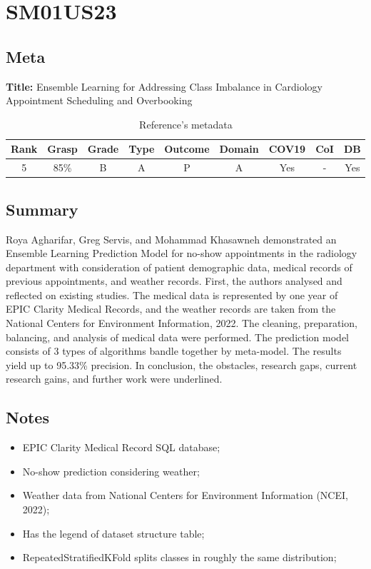 \section{ SM01US23 }


\subsection{Meta}

    \textbf{Title:}
    Ensemble Learning for Addressing Class Imbalance in Cardiology Appointment Scheduling and Overbooking

    \begin{table}[H]
        \centering
        \begin{tabular}{|c|c|c|c|c|c|c|c|c|}
            \hline
                \textbf{Rank} & \textbf{Grasp} & \textbf{Grade} & \textbf{Type} & \textbf{Outcome} & \textbf{Domain} & \textbf{COV19} & \textbf{CoI} & \textbf{DB} \\
            \hline
                5 & 85\% & B & A & P & A & Yes & - & Yes \\
            \hline
        \end{tabular}
        \caption{Reference's metadata}
        \label{tab:SM01US23}
    \end{table}

\subsection{Summary}
Roya Agharifar, Greg Servis, and Mohammad Khasawneh demonstrated an Ensemble Learning Prediction Model for no-show appointments in the radiology department with consideration of patient demographic data, medical records of previous appointments, and weather records. First, the authors analysed and reflected on existing studies. The medical data is represented by one year of EPIC Clarity Medical Records, and the weather records are taken from the National Centers for Environment Information, 2022. The cleaning, preparation, balancing, and analysis of medical data were performed. The prediction model consists of 3 types of algorithms bandle together by meta-model. The results yield up to 95.33\% precision. In conclusion, the obstacles, research gaps, current research gains, and further work were underlined.
    

\subsection{Notes}
    \begin{itemize}
        \item EPIC Clarity Medical Record SQL database;
        \item No-show prediction considering weather;
        \item Weather data from National Centers for Environment Information (NCEI, 2022);
        \item Has the legend of dataset structure table;
        \item RepeatedStratifiedKFold splits classes in roughly the same distribution;
    \end{itemize}


